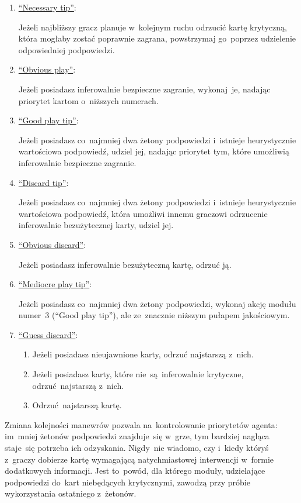 \documentclass[declaration,shortabstract,inz]{iithesis}
\begin{document}
\begin{enumerate}
	\item \underline{``Necessary tip''}:
	
	Jeżeli najbliższy gracz planuje w~kolejnym ruchu odrzucić kartę krytyczną, która mogłaby zostać poprawnie zagrana, powstrzymaj go~poprzez udzielenie odpowiedniej podpowiedzi.

	\item \underline{``Obvious play''}:
	
	Jeżeli posiadasz inferowalnie bezpieczne zagranie, wykonaj~je, nadając priorytet kartom o~niższych numerach.

	\item \underline{``Good play tip''}:
	
	Jeżeli posiadasz co~najmniej dwa żetony podpowiedzi i~istnieje heurystycznie wartościowa podpowiedź, udziel jej, nadając priorytet tym, które umożliwią inferowalnie bezpieczne zagranie.

	\item \underline{``Discard tip''}:
	
	Jeżeli posiadasz co~najmniej dwa żetony podpowiedzi i~istnieje heurystycznie wartościowa podpowiedź, która umożliwi innemu graczowi odrzucenie inferowalnie bezużytecznej karty, udziel jej.

	\item \underline{``Obvious discard''}:
	
	Jeżeli posiadasz inferowalnie bezużyteczną kartę, odrzuć ją.

	\item \underline{``Mediocre play tip''}:
	
	Jeżeli posiadasz co~najmniej dwa żetony podpowiedzi, wykonaj akcję modułu numer~3 (``Good play tip''), ale ze~znacznie niższym pułapem jakościowym.

	\item \underline{``Guess discard''}:
	\begin{enumerate}
		\item Jeżeli posiadasz nieujawnione karty, odrzuć najstarszą z~nich.
		\item Jeżeli posiadasz karty, które nie~są~inferowalnie krytyczne, odrzuć najstarszą z~nich.
		\item Odrzuć najstarszą kartę.
	\end{enumerate}

\end{enumerate}

Zmiana kolejności manewrów pozwala na~kontrolowanie priorytetów agenta: im~mniej żetonów podpowiedzi znajduje~się w~grze, tym bardziej nagląca staje~się potrzeba ich odzyskania. Nigdy~nie wiadomo, czy i~kiedy któryś z~graczy dobierze kartę wymagającą natychmiastowej interwencji w~formie dodatkowych informacji. Jest to~powód, dla którego moduły, udzielające podpowiedzi do~kart niebędących krytycznymi, zawodzą przy próbie wykorzystania ostatniego z~żetonów.
\end{document}
